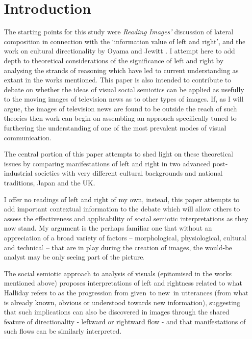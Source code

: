 \documentclass[11pt, oneside, a4paper]{scrartcl}
\newcommand{\nw} {{\sc new}}
\newcommand{\gv} {{\sc given}}
\begin{document}
\section{Introduction}%
\normalsize
The starting points for this study were \emph{Reading Images'} discussion of lateral composition in connection with the `information value of left and right'\citep{Kress:2006}, and the work on cultural directionality by Oyama and Jewitt \citep{Oyama:2000, Oyama:2001}. I attempt here to add depth to theoretical considerations of the significance of left and right by analysing the strands of reasoning which have led to current understanding as extant in the works mentioned. This paper is also intended to contribute to debate on whether the ideas of visual social semiotics can be applied as usefully to the moving images of television news as to other types of images. If, as I will argue, the images of television news are found to be outside the reach of such theories then work can begin on assembling an approach specifically tuned to furthering the understanding of one of the most prevalent modes of visual communication.

The central portion of this paper attempts to shed light on these theoretical issues by comparing manifestations of left and right in two advanced post-industrial societies with very different cultural backgrounds and national traditions, Japan and the UK.  

I offer no readings of left and right of my own, instead, this paper attempts to add important contextual information to the debate which will allow others to assess the effectiveness and applicability of social semiotic interpretations as they now stand. My argument is the perhaps familiar one that without an appreciation of a broad variety of factors -- morphological, physiological, cultural and technical -- that are in play during the creation of images, the would-be analyst may be only seeing part of the picture.

\bigskip

The social semiotic approach to analysis of visuals (epitomised in the works mentioned above) proposes interpretations of left and rightness related to what Halliday refers to as the progression from \gv\ to \nw\ in utterances (from what is already known, obvious or understood towards new information), suggesting that such implications can also be discovered in images through the shared feature of directionality - leftward or rightward flow - and that manifestations of such flows can be similarly interpreted.
\end{document}
